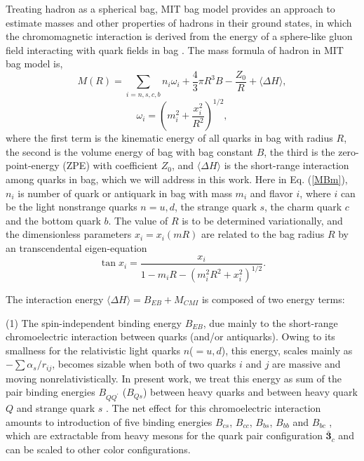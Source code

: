\documentclass[12pt,onecolumn,floatfix,nofootinbib]{revtex4}
\begin{document}
Treating hadron as a spherical bag, MIT bag model provides an approach to
estimate masses and other properties of hadrons in their ground states\cite%
{Johnson:1975zp,DeGrand:1975cf}, in which the chromomagnetic interaction is
derived from the energy of a sphere-like gluon field interacting with quark
fields in bag \cite{DeGrand:1975cf}. The mass formula of hadron in MIT bag
model is,
\begin{equation}
M\left( R\right) =\sum_{i=n,s,c,b}n_{i}\omega _{i}+\frac{4}{3}\pi R^{3}B-%
\frac{Z_{0}}{R}+\langle \Delta H\rangle ,  \label{MBm}
\end{equation}%
\begin{equation}
\omega _{i}=\left( m_{i}^{2}+\frac{x_{i}^{2}}{R^{2}}\right) ^{1/2},
\label{freq}
\end{equation}%
where the first term is the kinematic energy of all quarks in bag with
radius $R$, the second is the volume energy of bag with bag constant $B$,
the third is the zero-point-energy (ZPE) with coefficient $Z_{0}$, and $%
\langle \Delta H\rangle $ is the short-range interaction among quarks in
bag, which we will address in this work. Here in Eq. (\ref{MBm}), $n_{i}$ is
number of quark or antiquark in bag with mass $m_{i}$ and flavor $i$, where $%
i$ can be the light nonstrange quarks $n=u,d$, the strange quark $s$, the
charm quark $c$ and the bottom quark $b$. The value of $R$ is to be
determined variationally, and the dimensionless parameters $x_{i}=x_{i}(mR)$
are related to the bag radius $R$ by an transcendental eigen-equation
\begin{equation}
\tan x_{i}=\frac{x_{i}}{1-m_{i}R-\left( m_{i}^{2}R^{2}+x_{i}^{2}\right)
^{1/2}}.  \label{transc}
\end{equation}

The interaction energy $\langle \Delta H \rangle=B_{EB}+ M_{CMI}$ is
composed of two energy terms:

(1) The spin-independent binding energy $B_{EB}$, due mainly to the
short-range chromoelectric interaction between quarks (and/or antiquarks).
Owing to its smallness for the relativistic light quarks $n$($=u,d$), this
energy, scales mainly as $-\sum \alpha _{s}/r_{ij}$, becomes sizable when
both of two quarks $i$ and $j$ are massive and moving nonrelativistically.
In present work, we treat this energy as sum of the pair binding energies $%
B_{QQ^{\prime }}$ ($B_{Qs}$) between heavy quarks and between heavy quark $Q$
and strange quark $s$ \cite{KR:2014gca,Karliner:2017elp,Karliner:2018bms}.
The net effect for this chromoelectric interaction amounts to introduction
of five binding energies $B_{cs}$, $B_{cc}$, $B_{bs}$, $B_{bb}$ and $B_{bc}$%
, which are extractable from heavy mesons for the quark pair configuration $%
\boldsymbol{\bar{3}}_{c}$ and can be scaled to other color configurations.
\end{document}
